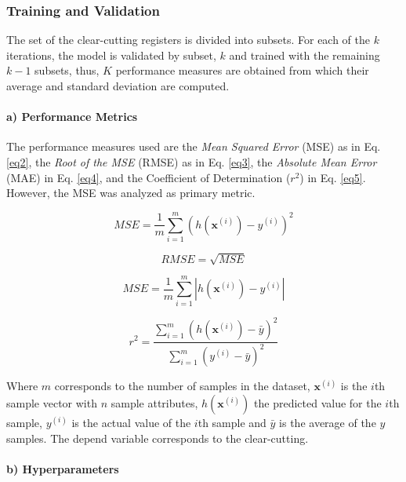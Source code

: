 \documentclass[conference]{IEEEtran}
\begin{document}
\subsubsection{Training and Validation}

The set of the clear-cutting registers is divided into subsets. For each of the $k$ iterations, the model is validated by subset, $k$ and trained with the remaining $k-1$ subsets, thus, $K$ performance measures are obtained from which their average and standard deviation are computed. 

\paragraph*{a) Performance Metrics} 

The performance measures used are the \textit{Mean Squared Error} (MSE) as in Eq. \eqref{eq2}, the \textit{Root of the MSE} (RMSE) as in Eq. \eqref{eq3}, the \textit{Absolute Mean Error} (MAE) in Eq. \eqref{eq4}, and the Coefficient of Determination ($r^2$) in Eq. \eqref{eq5}. However, the MSE was analyzed as primary metric.

\begin{equation}
\label{eq2}
MSE = \dfrac{1}{m} \sum_{i=1}^{m} ( h(\boldsymbol{x}^{(i)})- y^{(i)})^{2}
\end{equation}

\begin{equation}
\label{eq3}
RMSE = \sqrt{MSE}
\end{equation}

\begin{equation}
\label{eq4}
MSE = \dfrac{1}{m} \sum_{i=1}^{m} | h(\boldsymbol{x}^{(i)})- y^{(i)} |
\end{equation}

\begin{equation}
\label{eq5}
r^{2} = \dfrac
{\sum_{i=1}^{m} ( h(\boldsymbol{x}^{(i)})- \bar{y})^{2}}
{\sum_{i=1}^{m} ( y^{(i)}- \bar{y})^{2}}
\end{equation}

Where $m$ corresponds to the number of samples in the dataset, $\boldsymbol{x}^{(i)}$ is the $i$th sample vector with $n$ sample attributes, $h(\boldsymbol{x}^{(i)})$ the predicted value for the $i$th sample, $y^{(i)}$ is the actual value of the $i$th sample and $\bar{y}$ is the average of the $y$ samples. The depend variable corresponds to the clear-cutting.

\paragraph*{b) Hyperparameters} 
\end{document}
